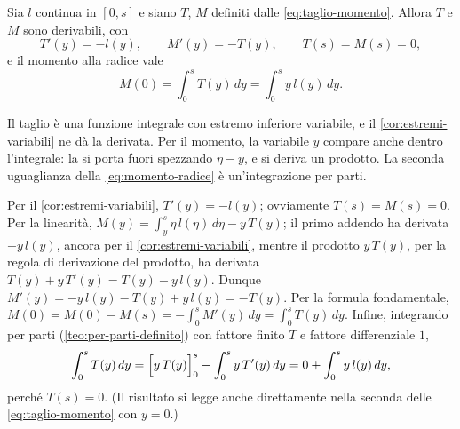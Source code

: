 \begin{proposizione}\label{prop:taglio-momento}
Sia $l$ continua in $[0,s]$ e siano $T$, $M$ definiti dalle \eqref{eq:taglio-momento}.
Allora $T$ e $M$ sono derivabili, con
\begin{equation}\label{eq:relazioni-trave}
  T'(y)=-l(y), \qquad M'(y)=-T(y), \qquad T(s)=M(s)=0 ,
\end{equation}
e il momento alla radice vale
\begin{equation}\label{eq:momento-radice}
  M(0)=\int_{0}^{s}T(y)\,dy=\int_{0}^{s}y\,l(y)\,dy .
\end{equation}
\end{proposizione}

\begin{schema}
\end{schema}

\begin{strategia}
Il taglio è una funzione integrale con estremo inferiore variabile, e il
\cref{cor:estremi-variabili} ne dà la derivata. Per il momento, la variabile $y$ compare
anche dentro l'integrale: la si porta fuori spezzando $\eta-y$, e si deriva un prodotto.
La seconda uguaglianza della \eqref{eq:momento-radice} è un'integrazione per parti.
\end{strategia}

\begin{dimostrazione}
Per il \cref{cor:estremi-variabili}, $T'(y)=-l(y)$; ovviamente $T(s)=M(s)=0$. Per la
linearità, $M(y)=\int_{y}^{s}\eta\,l(\eta)\,d\eta-y\,T(y)$; il primo addendo ha derivata
$-y\,l(y)$, ancora per il \cref{cor:estremi-variabili}, mentre il prodotto $y\,T(y)$, per la
regola di derivazione del prodotto, ha derivata $T(y)+y\,T'(y)=T(y)-y\,l(y)$. Dunque
$M'(y)=-y\,l(y)-T(y)+y\,l(y)=-T(y)$. Per la formula fondamentale,
$M(0)=M(0)-M(s)=-\int_{0}^{s}M'(y)\,dy=\int_{0}^{s}T(y)\,dy$. Infine, integrando per parti
(\cref{teo:per-parti-definito}) con fattore finito $T$ e fattore differenziale $1$,
\[
  \int_{0}^{s}T(y)\,dy=\Bigl[y\,T(y)\Bigr]_{0}^{s}-\int_{0}^{s}y\,T'(y)\,dy=0+\int_{0}^{s}y\,l(y)\,dy ,
\]
perché $T(s)=0$. (Il risultato si legge anche direttamente nella seconda delle
\eqref{eq:taglio-momento} con $y=0$.)
\end{dimostrazione}


